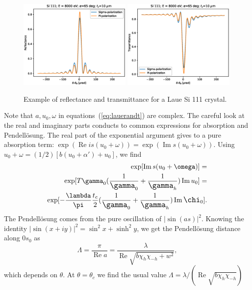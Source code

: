\documentclass[preprint]{iucr}              %
\newcommand{\inred}[1]{{\color{red}#1}}
\begin{document}
\begin{figure}\label{fig:laueProfiles}
    \centering
    \includegraphics[width=0.49\textwidth]{figures/Laue_1.eps}
    \includegraphics[width=0.49\textwidth]{figures/Laue_2.eps}
    \caption{Example of reflectance and transmittance for a Laue Si 111 crystal.}
\end{figure}

\inred{
Note that $a, u_0, \omega$ in equations~(\ref{eq:lauerandt}) are complex. The careful look at the real and imaginary parts conducts to common expressions for absorption and Pendell\"osung. The real part of the exponential argument gives to a pure absorption term:  
$\exp(\operatorname{Re} i s (u_0+\omega))
= \exp(\operatorname{Im} s (u_0 + \omega))$. Using $u_0 + \omega = (1/2)[b(u_0+\alpha')+u_0]$, we find
\begin{subequations}
\begin{align}
    \exp[\operatorname{Im} s (u_0+\omega)] = \nonumber\\
    \exp[T \gamma_0 \large( \frac{1}{\gamma_0} + \frac{1}{\gamma_h} \large) \operatorname{Im} u_0] = \nonumber \\
    \exp[-\frac{\lambda}{\pi} \frac{t_c}{2} \large( \frac{1}{\gamma_0} + \frac{1}{\gamma_h} \large) \operatorname{Im} \chi_0].
\end{align}
\end{subequations}
The Pendell\"osung comes from the pure oscillation of $|\sin(as)|^2$. Knowing the identity $|\sin(x+iy)|^2=\sin^2x + \sinh^2 y$, we get the Pendell\"osung distance along $0s_0$ as 
\begin{equation}
    \Lambda = \frac{\pi}{\operatorname{Re} a}=\frac{\lambda}{\operatorname{Re}\sqrt{b\chi_h\chi_{-h} + w^2}},
\end{equation}
which depends on $\theta$. At $\theta=\theta_c$ we find the usual value $\Lambda=\lambda/(\operatorname{Re}\sqrt{b \chi_h \chi_{-h}})$ 
}
\end{document}
